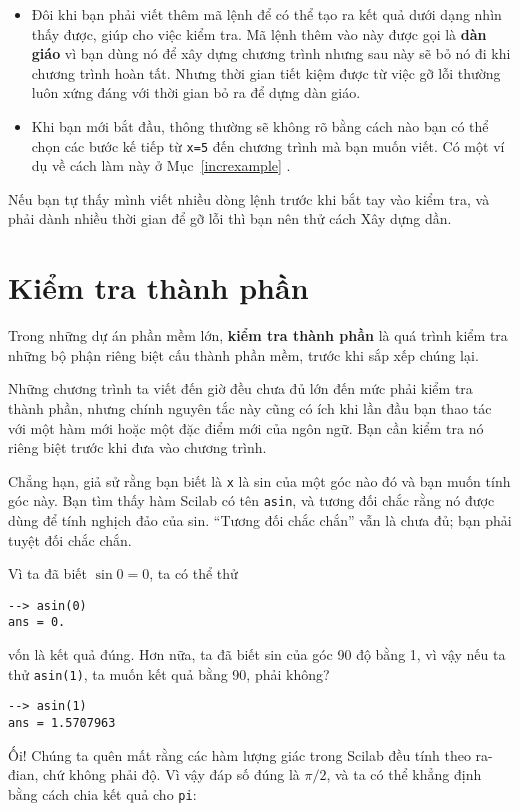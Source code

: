 \documentclass[12pt]{book}
\begin{document}
\begin{itemize}

\item Đôi khi bạn phải viết thêm mã lệnh để có thể tạo ra kết quả
dưới dạng nhìn thấy được, giúp cho việc kiểm tra. Mã lệnh thêm vào
này được gọi là {\bf dàn giáo} vì bạn dùng nó để xây dựng chương trình
nhưng sau này sẽ bỏ nó đi khi chương trình hoàn tất. Nhưng thời gian
tiết kiệm được từ việc gỡ lỗi thường luôn xứng đáng với thời gian
bỏ ra để dựng dàn giáo.

\item Khi bạn mới bắt đầu, thông thường sẽ không rõ bằng cách nào
bạn có thể chọn các bước kế tiếp từ {\tt x=5} đến chương trình mà
bạn muốn viết. Có một ví dụ về cách làm này ở Mục~\ref{increxample} .

\end{itemize}

Nếu bạn tự thấy mình viết nhiều dòng lệnh trước khi bắt tay vào 
kiểm tra, và phải dành nhiều thời gian để gỡ lỗi thì bạn nên thử
cách Xây dựng dần.


\section{Kiểm tra thành phần}

Trong những dự án phần mềm lớn, {\bf kiểm tra thành phần} là 
quá trình kiểm tra những bộ phận riêng biệt cấu thành phần mềm,
trước khi sắp xếp chúng lại.

Những chương trình ta viết đến giờ đều chưa đủ lớn đến mức phải
kiểm tra thành phần, nhưng chính nguyên tắc này cũng có ích khi
lần đầu bạn thao tác với một hàm mới hoặc một đặc điểm mới của 
ngôn ngữ. Bạn cần kiểm tra nó riêng biệt trước khi đưa vào 
chương trình.

Chẳng hạn, giả sử rằng bạn biết là {\tt x} là sin của một góc nào đó
và bạn muốn tính góc này. Bạn tìm thấy hàm Scilab có tên {\tt asin},
và tương đối chắc rằng nó được dùng để tính nghịch đảo của sin.
``Tương đối chắc chắn'' vẫn là chưa đủ; bạn phải tuyệt đối chắc
chắn.

Vì ta đã biết $\sin 0 = 0$, ta có thể thử

\begin{verbatim}
--> asin(0)
ans = 0.
\end{verbatim}
%
\noindent vốn là kết quả đúng. Hơn nữa, ta đã biết sin của góc 90 độ 
bằng 1, vì vậy nếu ta thử {\tt asin(1)}, ta muốn kết quả bằng 90, 
phải không?

\begin{verbatim}
--> asin(1)
ans = 1.5707963
\end{verbatim}
%
Ối! Chúng ta quên mất rằng các hàm lượng giác trong Scilab đều 
tính theo ra-đian, chứ không phải độ. Vì vậy đáp số đúng là $\pi/2$, 
và ta có thể khẳng định bằng cách chia kết quả cho {\tt pi}:
\end{document}
